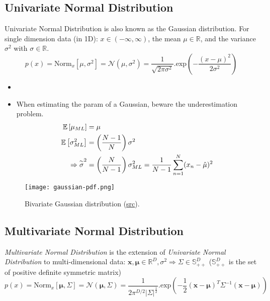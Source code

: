 \subsection{Univariate Normal Distribution}
Univariate Normal Distribution is also known as the Gaussian distribution. For single dimension data (in 1D): $x \in (-\infty, \infty)$, the mean $\mu \in \mathbb{R}$, and the variance $\sigma^2$ with $\sigma \in \mathbb{R}$.
\begin{equation}
	p(x) = \text{Norm}_x\left[\mu, \sigma^2\right] = \mathcal{N}(\mu, \sigma^2) = \frac{1}{\sqrt{2\pi\sigma^2}}.\text{exp}\left(-\frac{(x-\mu)^2}{2\sigma^2}\right)
\end{equation}
\note
\begin{itemize}
	\item {}
	\item When estimating the \ac{param} of a Gaussian, beware the underestimation problem.
	\begin{align*}
		\mathbb{E} \left[ \mu_{ML} \right] &= \mu \\
		\mathbb{E} \left[ \sigma^2_{ML} \right] &= \left(\frac{N-1}{N}\right)\sigma^2 \\
		\Rightarrow \overset{\sim}{\sigma}^2 &= \left(\frac{N}{N-1}\right)\sigma^2_{ML} = \frac{1}{N-1} \sum_{n=1}^{N} (x_n-\hat{\mu})^2
	\end{align*}
\end{itemize}
\begin{figure}[hbt!]
	\centering
	\texttt{[image: gaussian-pdf.png]}
	\caption{Bivariate Gaussian distribution (\href{https://stats.stackexchange.com/questions/102632/plot-two-dimensional-gaussian-density-function-in-matlab}{src}).}
	\label{fig:relation-ai-ml-dl}
\end{figure}

\subsection{Multivariate Normal Distribution}
\textit{Multivariate Normal Distribution} is the extension of \textit{Univariate Normal Distribution} to multi-dimensional data: $\textbf{x}, \boldsymbol{\mu} \in \mathbb{R}^D, \sigma^2 \Rightarrow \Sigma \in \mathbb{S}^D_{++}$ ($\mathbb{S}^D_{++}$ is the set of positive definite symmetric matrix)
\begin{equation}
	p(x) = \text{Norm}_x [\boldsymbol{\mu}, \Sigma] = \mathcal{N}(\boldsymbol{\mu}, \Sigma) = \frac{1}{2\pi^{D/2}| \Sigma|^{\frac{1}{2}}} . \text{exp} \left( -\frac{1}{2} {(\textbf{x} - \boldsymbol{\mu})^T \Sigma^{-1} (\textbf{x} - \boldsymbol{\mu})} \right)
\end{equation}

